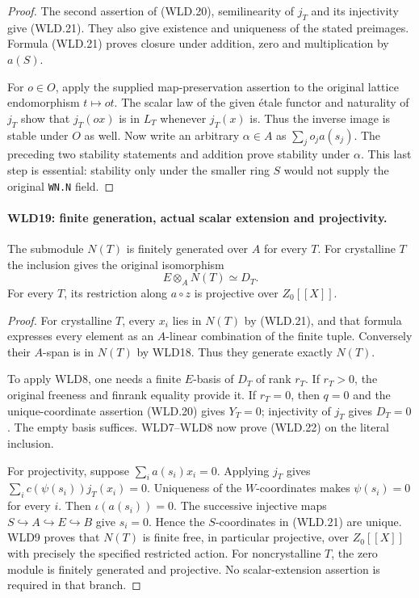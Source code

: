\begin{proof}
The second assertion of (WLD.20), semilinearity of $j_T$ and its
injectivity give (WLD.21). They also give existence and uniqueness
of the stated preimages. Formula (WLD.21) proves closure under
addition, zero and multiplication by $a(S)$.

For $o\in O$, apply the supplied map-preservation assertion to the
original lattice endomorphism $t\mapsto ot$. The scalar law of
the given \'etale functor and naturality of $j_T$ show that
$j_T(ox)$ is in $L_T$ whenever $j_T(x)$ is. Thus the inverse
image is stable under $O$ as well. Now write an arbitrary
$\alpha\in A$ as $\sum_j o_ja(s_j)$. The preceding two stability
statements and addition prove stability under $\alpha$.
This last step is essential: stability only under the smaller
ring $S$ would not supply the original \texttt{WN.\allowbreak N} field.
\end{proof}

\paragraph{WLD19: finite generation, actual scalar extension and projectivity.}
\label{claim:WLD19}
The submodule $N(T)$ is finitely generated over $A$ for every $T$.
For crystalline $T$ the inclusion gives the original isomorphism
\[
                        E\otimes_A N(T)\simeq D_T.         \tag{WLD.22}
\]
For every $T$, its restriction along $a\circ z$ is projective
over $Z_0[[X]]$.

\begin{proof}
For crystalline $T$, every $x_i$ lies in $N(T)$ by (WLD.21),
and that formula expresses every element as an $A$-linear
combination of the finite tuple. Conversely their $A$-span is
in $N(T)$ by WLD18. Thus they generate exactly $N(T)$.

To apply WLD8, one needs a finite $E$-basis of $D_T$ of rank $r_T$.
If $r_T>0$, the original freeness and finrank equality provide it.
If $r_T=0$, then $q=0$ and the unique-coordinate assertion
(WLD.20) gives $Y_T=0$; injectivity of $j_T$ gives $D_T=0$.
The empty basis suffices. WLD7--WLD8 now prove (WLD.22) on
the literal inclusion.

For projectivity, suppose $\sum_i a(s_i)x_i=0$. Applying $j_T$
gives $\sum_i c(\psi(s_i))j_T(x_i)=0$. Uniqueness of the
$W$-coordinates makes $\psi(s_i)=0$ for every $i$.
Then $\iota(a(s_i))=0$. The successive injective maps
$S\hookrightarrow A\hookrightarrow E\hookrightarrow B$
give $s_i=0$. Hence the $S$-coordinates in (WLD.21) are unique.
WLD9 proves that $N(T)$ is finite free, in particular projective,
over $Z_0[[X]]$ with precisely the specified restricted action.
For noncrystalline $T$, the zero module is finitely generated
and projective. No scalar-extension assertion is required in
that branch.
\end{proof}

